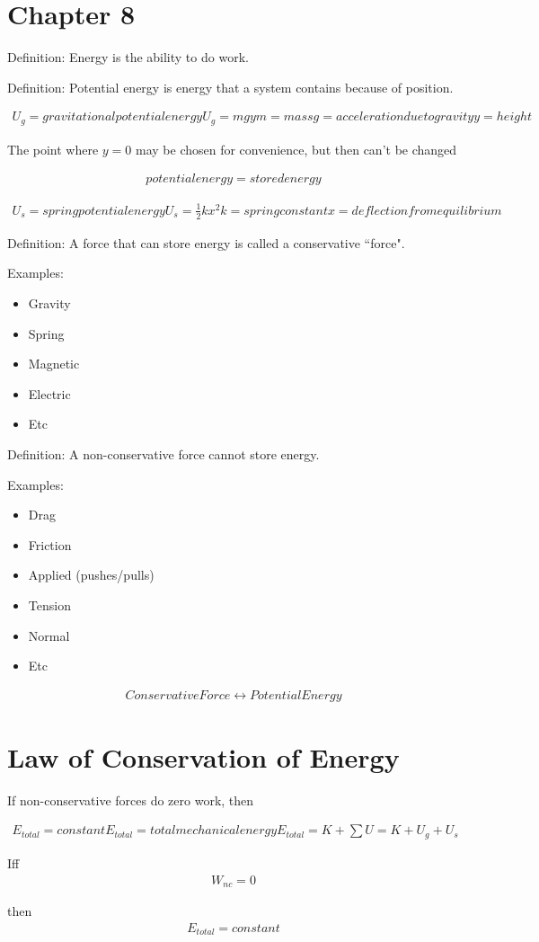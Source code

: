 \section{Chapter 8}

Definition: Energy is the ability to do work.

Definition: Potential energy is energy that a system contains because of position.

\begin{align}
 U_g = gravitational potential energy
 U_g = mgy
 m = mass
 g = acceleration due to gravity
 y = height
\end{align}

The point where $y = 0$ may be chosen for convenience, but then can't be changed

\begin{align}
	potential energy = stored energy
\end{align}

\begin{align}
	U_s = spring potential energy
	U_s = \frac{1}{2}kx^2
	k = spring constant
	x = deflection from equilibrium
\end{align}

Definition: A force that can store energy is called a conservative ``force".

Examples:
\begin{itemize}
	\item Gravity
	\item Spring
	\item Magnetic
	\item Electric
	\item Etc
\end{itemize}

Definition: A non-conservative force cannot store energy.

Examples:
\begin{itemize}
	\item Drag
	\item Friction
	\item Applied (pushes/pulls)
	\item Tension
	\item Normal
	\item Etc
\end{itemize}

\begin{align}
	Conservative Force \leftrightarrow Potential Energy
\end{align}

\section{Law of Conservation of Energy}

If non-conservative forces do zero work, then

\begin{align}
	E_{total} = constant
	E_{total} = total mechanical energy
	E_{total} = K + \sum U
	= K + U_g + U_s
\end{align}

Iff
\begin{align}
	W_{nc} = 0
\end{align}

then
\begin{align}
	E_{total} = constant
\end{align}

